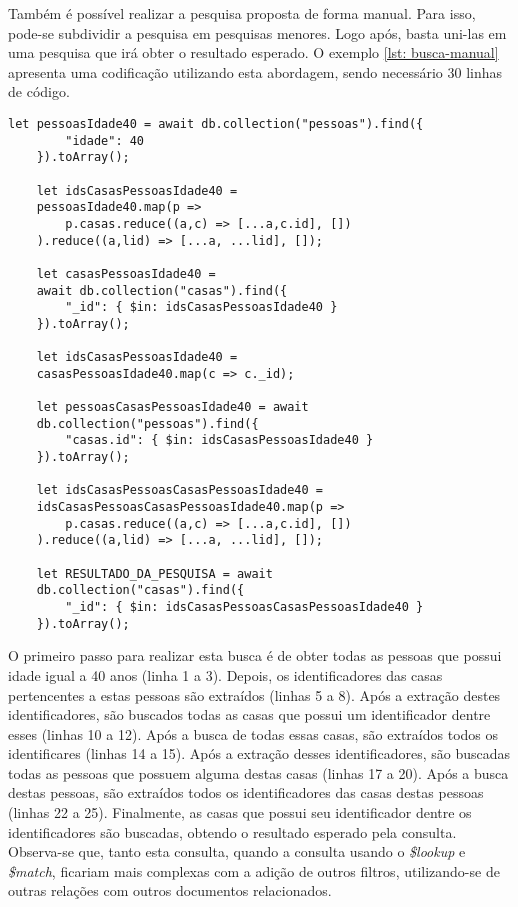 Também é possível realizar a pesquisa proposta de forma manual. Para isso, pode-se subdividir a pesquisa em pesquisas menores. Logo após, basta uni-las em uma pesquisa que irá obter o resultado esperado. O exemplo \ref{lst: busca-manual} apresenta uma codificação utilizando esta abordagem, sendo necessário 30 linhas de código.



\begin{lstlisting}[style=ES6, caption={Busca em Dados Normalizados de Forma Manual\label{lst: busca-manual}}]
    let pessoasIdade40 = await db.collection("pessoas").find({
        "idade": 40
    }).toArray();
    
    let idsCasasPessoasIdade40 = 
    pessoasIdade40.map(p => 
        p.casas.reduce((a,c) => [...a,c.id], [])
    ).reduce((a,lid) => [...a, ...lid], []);
    
    let casasPessoasIdade40 =
    await db.collection("casas").find({
        "_id": { $in: idsCasasPessoasIdade40 }
    }).toArray();
    
    let idsCasasPessoasIdade40 = 
    casasPessoasIdade40.map(c => c._id);
    
    let pessoasCasasPessoasIdade40 = await
    db.collection("pessoas").find({
        "casas.id": { $in: idsCasasPessoasIdade40 }
    }).toArray();
    
    let idsCasasPessoasCasasPessoasIdade40 = 
    idsCasasPessoasCasasPessoasIdade40.map(p => 
        p.casas.reduce((a,c) => [...a,c.id], [])
    ).reduce((a,lid) => [...a, ...lid], []);
    
    let RESULTADO_DA_PESQUISA = await
    db.collection("casas").find({
        "_id": { $in: idsCasasPessoasCasasPessoasIdade40 }
    }).toArray();
\end{lstlisting}
    
O primeiro passo para realizar esta busca é de obter todas as pessoas que possui idade igual a 40 anos (linha 1 a 3). Depois, os identificadores das casas pertencentes a estas pessoas são extraídos (linhas 5 a 8). Após a extração destes identificadores, são buscados todas as casas que possui um identificador dentre esses (linhas 10 a 12). Após a busca de todas essas casas, são extraídos todos os identificares (linhas 14 a 15). Após a extração desses identificadores, são buscadas todas as pessoas que possuem alguma destas casas (linhas 17 a 20). Após a busca destas pessoas, são extraídos todos os identificadores das casas destas pessoas (linhas 22 a 25). Finalmente, as casas que possui seu identificador dentre os identificadores são buscadas, obtendo o resultado esperado pela consulta. Observa-se que, tanto esta consulta, quando a consulta usando o \textit{\$lookup} e \textit{\$match}, ficariam mais complexas com a adição de outros filtros, utilizando-se de outras relações com outros documentos relacionados.

